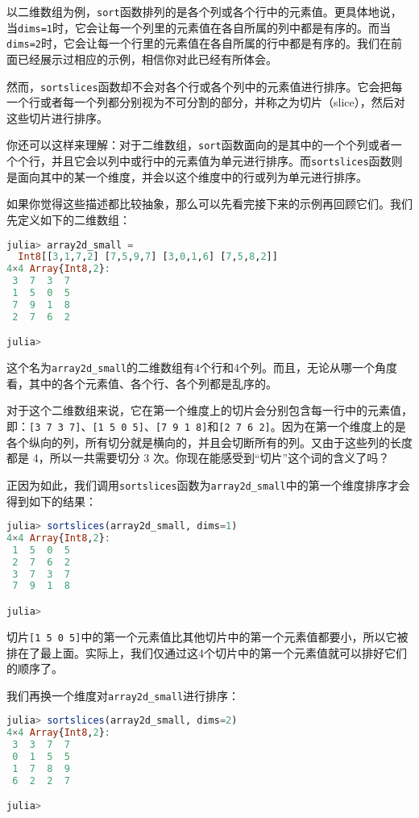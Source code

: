 以二维数组为例，\verb`sort`函数排列的是各个列或各个行中的元素值。更具体地说，当\verb`dims=1`时，它会让每一个列里的元素值在各自所属的列中都是有序的。而当\verb`dims=2`时，它会让每一个行里的元素值在各自所属的行中都是有序的。我们在前面已经展示过相应的示例，相信你对此已经有所体会。

然而，\verb`sortslices`函数却不会对各个行或各个列中的元素值进行排序。它会把每一个行或者每一个列都分别视为不可分割的部分，并称之为切片（slice），然后对这些切片进行排序。

你还可以这样来理解：对于二维数组，\verb`sort`函数面向的是其中的一个个列或者一个个行，并且它会以列中或行中的元素值为单元进行排序。而\verb`sortslices`函数则是面向其中的某一个维度，并会以这个维度中的行或列为单元进行排序。

如果你觉得这些描述都比较抽象，那么可以先看完接下来的示例再回顾它们。我们先定义如下的二维数组：

\begin{lstlisting}[language=julia]
julia> array2d_small = 
  Int8[[3,1,7,2] [7,5,9,7] [3,0,1,6] [7,5,8,2]]
4×4 Array{Int8,2}:
 3  7  3  7
 1  5  0  5
 7  9  1  8
 2  7  6  2

julia> 
\end{lstlisting}

这个名为\verb`array2d_small`的二维数组有4个行和4个列。而且，无论从哪一个角度看，其中的各个元素值、各个行、各个列都是乱序的。

对于这个二维数组来说，它在第一个维度上的切片会分别包含每一行中的元素值，即：\verb`[3 7 3 7]`、\verb`[1 5 0 5]`、\verb`[7 9 1 8]`和\verb`[2 7 6 2]`。因为在第一个维度上的是各个纵向的列，所有切分就是横向的，并且会切断所有的列。又由于这些列的长度都是 4，所以一共需要切分 3 次。你现在能感受到“切片”这个词的含义了吗？

正因为如此，我们调用\verb`sortslices`函数为\verb`array2d_small`中的第一个维度排序才会得到如下的结果：

\begin{lstlisting}[language=julia]
julia> sortslices(array2d_small, dims=1)
4×4 Array{Int8,2}:
 1  5  0  5
 2  7  6  2
 3  7  3  7
 7  9  1  8

julia> 
\end{lstlisting}

切片\verb`[1 5 0 5]`中的第一个元素值比其他切片中的第一个元素值都要小，所以它被排在了最上面。实际上，我们仅通过这4个切片中的第一个元素值就可以排好它们的顺序了。

我们再换一个维度对\verb`array2d_small`进行排序：

\begin{lstlisting}[language=julia]
julia> sortslices(array2d_small, dims=2)
4×4 Array{Int8,2}:
 3  3  7  7
 0  1  5  5
 1  7  8  9
 6  2  2  7

julia> 
\end{lstlisting}

